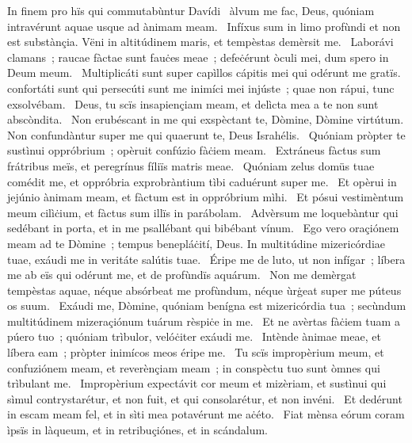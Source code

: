 { In finem pro hïs qui commutabùntur Davídi}
{%
~àlvum me fac, Deus, quóniam intravérunt aquae usque ad ànimam meam. 
~Infíxus sum in limo profùndi et non est substànçia. Vëni in altitúdinem maris, et tempèstas demèrsit me. 
~Laborávi clamans~; raucae fàctae sunt fauċes meae~; defeċérunt òculi mei, dum spero in Deum meum. 
~Multiplicáti sunt super capìllos cápitis mei qui odérunt me gratïs. confortáti sunt qui persecúti sunt me inimíci mei injúste~; quae non rápui, tunc exsolvébam. 
~Deus, tu scïs insapiençiam meam, et delìcta mea a te non sunt abscòndita. 
~Non erubéscant in me qui exspèctant te, Dòmine, Dòmine virtútum. Non confundàntur super me qui quaerunt te, Deus Israhélis. 
~Quóniam pròpter te sustìnui oppróbrium~; opèruit confúzio fàċiem meam. 
~Extráneus fàctus sum frátribus meïs, et peregrínus fíliïs matris meae. 
~Quóniam zelus domüs tuae comédit me, et oppróbria exprobràntium tìbi caduérunt super me. 
~Et opèrui in jejúnio ànimam meam, et fàctum est in oppróbrium mìhi. 
~Et pósui vestimèntum meum cilìċium, et fàctus sum illïs in parábolam. 
~Advèrsum me loquebàntur qui sedébant in porta, et in me psallébant qui bibébant vínum. 
~Ego vero oraçiónem meam ad te Dòmine~; tempus benepláċití, Deus. In multitúdine mizericórdiae tuae, exáudi me in veritáte salútis tuae. 
~Éripe me de luto, ut non infígar~; líbera me ab eïs qui odérunt me, et de profùndïs aquárum. 
~Non me demèrgat tempèstas aquae, néque absórbeat me profùndum, néque ùrġeat super me púteus os suum. 
~Exáudi me, Dòmine, quóniam benígna est mizericórdia tua~; secùndum multitúdinem mizeraçiónum tuárum rèspiċe in me. 
~Et ne avèrtas fàċiem tuam a púero tuo~; quóniam trìbulor, velóċiter exáudi me. 
~Intènde ànimae meae, et líbera eam~; pròpter inimícos meos éripe me. 
~Tu scïs impropèrium meum, et confuziónem meam, et reverènçiam meam~; in conspèctu tuo sunt òmnes qui trìbulant me. 
~Impropèrium expectávit cor meum et mizèriam, et sustìnui qui sìmul contrystarétur, et non fuit, et qui consolarétur, et non invéni. 
~Et dedérunt in escam meam fel, et in sìti mea potavérunt me aċéto. 
~Fiat mènsa eórum coram ìpsïs in làqueum, et in retribuçiónes, et in scándalum. 
}
